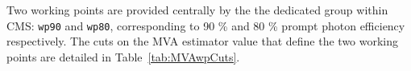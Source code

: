 
Two working points are provided centrally by the the dedicated group within CMS:
\texttt{wp90} and \texttt{wp80}, corresponding to 90 \% and 80 \% prompt photon efficiency respectively.
The cuts on the MVA estimator value that define the two working points are detailed in Table~\ref{tab:MVAwpCuts}.


